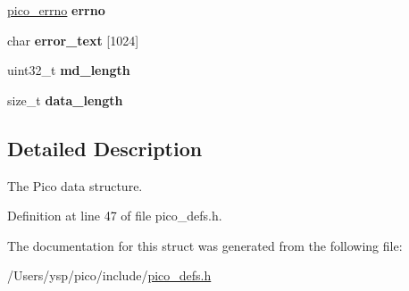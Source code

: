 \begin{DoxyCompactItemize}
\item 
\hypertarget{struct_p_i_c_o_afc5dd4dbede70884b98f307be768a578}{\hyperlink{pico__errno_8h_a7ddd7f611d53c5fe4d792f093a08ef48}{pico\+\_\+errno} {\bfseries errno}}\label{struct_p_i_c_o_afc5dd4dbede70884b98f307be768a578}

\item 
\hypertarget{struct_p_i_c_o_a5a6768c416a0bb2fc55a5c17e5ea94bb}{char {\bfseries error\+\_\+text} \mbox{[}1024\mbox{]}}\label{struct_p_i_c_o_a5a6768c416a0bb2fc55a5c17e5ea94bb}

\item 
\hypertarget{struct_p_i_c_o_a18ae2b279d5608de92b15c62e324d9b9}{uint32\+\_\+t {\bfseries md\+\_\+length}}\label{struct_p_i_c_o_a18ae2b279d5608de92b15c62e324d9b9}

\item 
\hypertarget{struct_p_i_c_o_ac710ca74549e34346fcf7c3a81c63ea3}{size\+\_\+t {\bfseries data\+\_\+length}}\label{struct_p_i_c_o_ac710ca74549e34346fcf7c3a81c63ea3}

\end{DoxyCompactItemize}


\subsection{Detailed Description}
The Pico data structure. 

Definition at line 47 of file pico\+\_\+defs.\+h.



The documentation for this struct was generated from the following file\+:\begin{DoxyCompactItemize}
\item 
/\+Users/ysp/pico/include/\hyperlink{pico__defs_8h}{pico\+\_\+defs.\+h}\end{DoxyCompactItemize}
